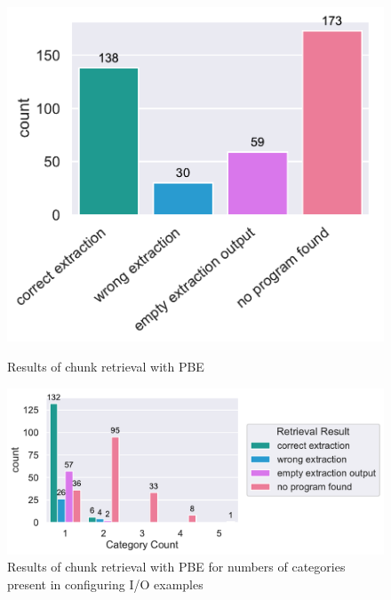 \documentclass[\myrootdir/main.tex]{subfiles}
\begin{document}
\begin{figure}[htbp]
	\centering
	\begin{minipage}{0.45\textwidth}
		\centering
		\includegraphics[width=\textwidth, clip]{img/big-study/failure-reason-PBE.pdf}
		\caption{Results of chunk retrieval with PBE}
		\label{fig:failure-reason-PBE}
	\end{minipage}\hfill
	\begin{minipage}{0.45\textwidth}
		\centering
		\includegraphics[width=\textwidth, clip]{img/big-study/failure-reason-categorycount-PBE.pdf}
		\caption{Results of chunk retrieval with PBE for numbers of categories present in configuring I/O examples}
		\label{fig:failure-reason-categorycount-PBE}
	\end{minipage}
\end{figure}
\end{document}
